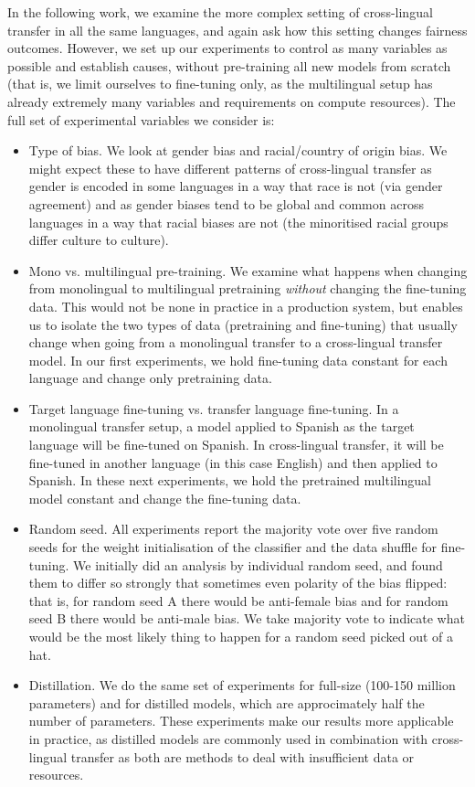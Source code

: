 In the following work, we examine the more complex setting of cross-lingual transfer in all the same languages, and again ask how this setting changes fairness outcomes. However, we set up our experiments to control as many variables as possible and establish causes, without pre-training all new models from scratch (that is, we limit ourselves to fine-tuning only, as the multilingual setup has already extremely many variables and requirements on compute resources). The full set of experimental variables we consider is:
\begin{itemize}
    \item Type of bias. We look at gender bias and racial/country of origin bias. We might expect these to have different patterns of cross-lingual transfer as gender is encoded in some languages in a way that race is not (via gender agreement) and as gender biases tend to be global and common across languages in a way that racial biases are not (the minoritised racial groups differ culture to culture).
    \item Mono vs. multilingual pre-training. We examine what happens when changing from monolingual to multilingual pretraining \textit{without} changing the fine-tuning data. This would not be none in practice in a production system, but enables us to isolate the two types of data (pretraining and fine-tuning) that usually change when going from a monolingual transfer to a cross-lingual transfer model. In our first experiments, we hold fine-tuning data constant for each language and change only pretraining data.
    \item Target language fine-tuning vs. transfer language fine-tuning. In a monolingual transfer setup, a model applied to Spanish as the target language will be fine-tuned on Spanish. In cross-lingual transfer, it will be fine-tuned in another language (in this case English) and then applied to Spanish. In these next experiments, we hold the pretrained multilingual model constant and change the fine-tuning data.
    \item Random seed. All experiments report the majority vote over five random seeds for the weight initialisation of the classifier and the data shuffle for fine-tuning. We initially did an analysis by individual random seed, and found them to differ so strongly that sometimes even polarity of the bias flipped: that is, for random seed A there would be anti-female bias and for random seed B there would be anti-male bias. We take majority vote to indicate what would be the most likely thing to happen for a random seed picked out of a hat.
    \item Distillation. We do the same set of experiments for full-size (100-150 million parameters) and for distilled models, which are approcimately half the number of parameters. These experiments make our results more applicable in practice, as distilled models are commonly used in combination with cross-lingual transfer as both are methods to deal with insufficient data or resources.
\end{itemize}

